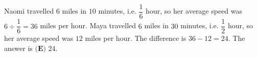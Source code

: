 Naomi travelled $6$ miles in $10$ minutes, i.e. $\dfrac16$ hour, so her average speed was $6\div\dfrac16=36$ miles per hour. Maya travelled $6$ miles in $30$ minutes, i.e. $\dfrac12$ hour, so her average speed was $12$ miles per hour. The difference is $36-12=24$. The answer is $\boxed{\textbf{(E) }24}$.
